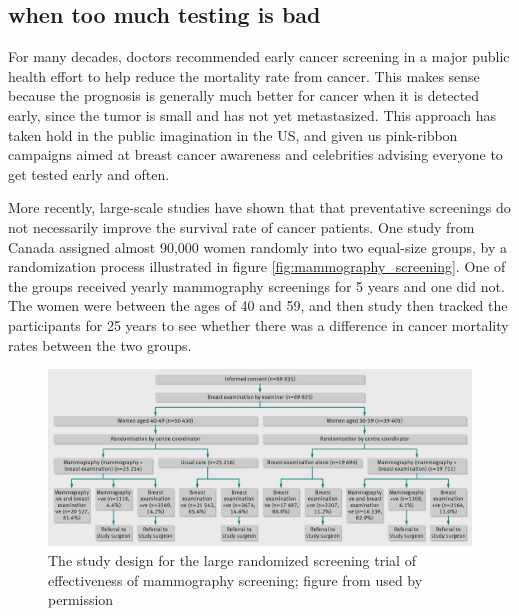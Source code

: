 \documentclass[
  letterpaper,
  DIV=11,
  numbers=noendperiod]{scrreprt}
\begin{document}
\hypertarget{when-too-much-testing-is-bad}{%
\subsection{when too much testing is
bad}\label{when-too-much-testing-is-bad}}

For many decades, doctors recommended early cancer screening in a major
public health effort to help reduce the mortality rate from cancer. This
makes sense because the prognosis is generally much better for cancer
when it is detected early, since the tumor is small and has not yet
metastasized. This approach has taken hold in the public imagination in
the US, and given us pink-ribbon campaigns aimed at breast cancer
awareness and celebrities advising everyone to get tested early and
often.

More recently, large-scale studies have shown that that preventative
screenings do not necessarily improve the survival rate of cancer
patients. One study from Canada \cite{miller_twenty_2014} assigned
almost 90,000 women randomly into two equal-size groups, by a
randomization process illustrated in figure
\ref{fig:mammography_screening}. One of the groups received yearly
mammography screenings for 5 years and one did not. The women were
between the ages of 40 and 59, and then study then tracked the
participants for 25 years to see whether there was a difference in
cancer mortality rates between the two groups.

\begin{figure}

{\centering \includegraphics{./ch7/mammography_screening.png}

}

\caption{The study design for the large randomized screening trial of
effectiveness of mammography screening; figure from
\cite{miller_twenty_2014} used by permission}

\end{figure}
\end{document}
